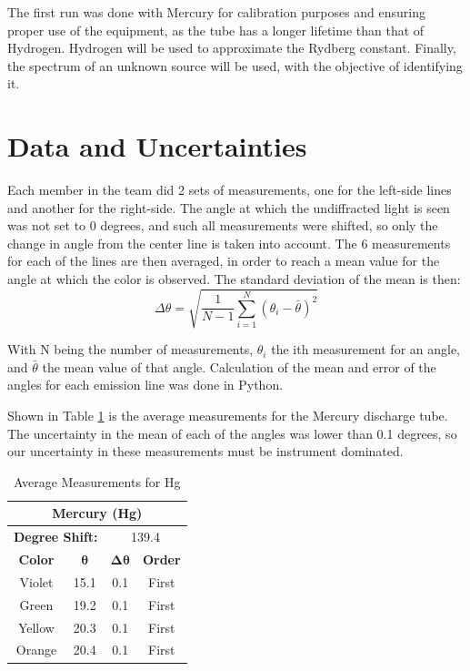 \documentclass[a4paper, twocolumn]{article}
\begin{document}
The first run was done with Mercury for calibration purposes and ensuring proper use of the equipment, as the tube has a longer
lifetime than that of Hydrogen. Hydrogen will be used to approximate the Rydberg constant. Finally, the spectrum of an unknown source
will be used, with the objective of identifying it.

\section{Data and Uncertainties}
Each member in the team did 2 sets of measurements, one for the left-side lines and another for the right-side. The angle at which
the undiffracted light is seen was not set to 0 degrees, and such all measurements were shifted, so only the change in angle from the center
line is taken into account. The 6 measurements for each of the lines are then averaged, in order to reach a mean value for the angle at which
the color is observed. The standard deviation of the mean is then:
\begin{equation}
 \Delta\theta = \sqrt{\frac{1}{N-1} \sum_{i=1}^{N}(\theta_i-\bar{\theta})^2}
\end{equation}

With N being the number of measurements, $\theta_i$ the ith measurement for an angle, and $\bar{\theta}$ the mean value of that angle.
Calculation of the mean and error of the angles for each emission line was done in Python.

Shown in Table \ref{table:anglesHg} is the average measurements for the Mercury discharge tube. The uncertainty in the mean of each of the angles was
lower than 0.1 degrees, so our uncertainty in these measurements must be instrument dominated. 
\begin{table}[h!]
\centering
\begin{tabular}{ |c||c|c|c| }
 \hline
 \multicolumn{4}{|c|}{\textbf{Mercury (Hg)}} \\
 \hline
 \multicolumn{2}{|c}{\textbf{Degree Shift:}} &
 \multicolumn{2}{|c|}{139.4} \\
 \hline
 \textbf{Color} & $\boldsymbol{\theta}$ & $\boldsymbol{\Delta\theta}$ & \textbf{Order} \\
 \hline
 Violet & 15.1 & 0.1 & First \\
 \hline
 Green & 19.2 & 0.1 & First\\ 
 \hline
 Yellow & 20.3 & 0.1 & First \\
 \hline
 Orange & 20.4 & 0.1 & First \\
 \hline
\end{tabular}
\caption{Average Measurements for Hg}
\label{table:anglesHg}
\end{table}
\end{document}
